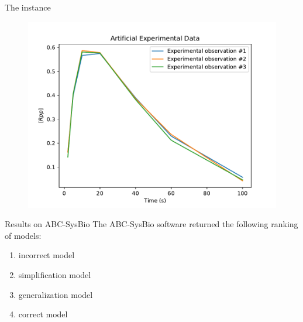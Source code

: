 \documentclass{beamer}
\begin{document}
\begin{frame}{The instance}
\begin{figure}
\begin{center}
\includegraphics[width=.75\textwidth]{experiments/simulations/girolami_experimental_data.pdf}
\end{center}
\end{figure}

\end{frame}

\begin{frame}{Results on ABC-SysBio}
The ABC-SysBio software returned the following ranking of models:
    \begin{enumerate}
        \pause
    \item{incorrect model}
        \pause
    \item{simplification model}
        \pause
    \item{generalization model}
        \pause
    \item{correct model}
    \end{enumerate}
\end{frame}
\end{document}

